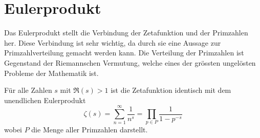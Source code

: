 \section{Eulerprodukt} \label{zeta:section:eulerprodukt}

Das Eulerprodukt stellt die Verbindung der Zetafunktion und der Primzahlen her.
Diese Verbindung ist sehr wichtig, da durch sie eine Aussage zur Primzahlverteilung gemacht werden kann.
Die Verteilung der Primzahlen ist Gegenstand der Riemannschen Vermutung, welche eines der grössten ungelösten Probleme der Mathematik ist.

\begin{satz}
    Für alle Zahlen $s$ mit $\Re(s) > 1$ ist die Zetafunktion identisch mit dem unendlichen Eulerprodukt
    \begin{equation}\label{zeta:eq:eulerprodukt}
        \zeta(s)
        =
        \sum_{n=1}^\infty
        \frac{1}{n^s}
        =
        \prod_{p \in P}
        \frac{1}{1-p^{-s}}
    \end{equation}
    wobei $P$ die Menge aller Primzahlen darstellt.
\end{satz}

